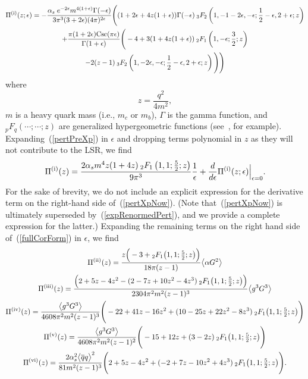 \documentclass[11pt, letterpaper]{article}
\newcommand{\hypgeom}[2]{{}_{#1}F_{#2}}
\newcommand{\rom}[1]{\uppercase\expandafter{\romannumeral #1\relax}}
\begin{document}
\begin{multline} \label{pertPreXp}
  \Pi^{(\mathrm{\rom{1}})}(z ; \epsilon) = -\frac{\alpha_s \; e^{-2 \epsilon} m^{4(1+\epsilon)} \Gamma(-\epsilon)}{3 \pi^3(3+2 \epsilon)(4 \pi)^{2 \epsilon}}  \Bigg(
  (1 + 2 \epsilon + 4 z (1 + \epsilon)) \Gamma(-\epsilon) \:\hypgeom{3}{2}\left(1,-1-2\epsilon,-\epsilon;\frac{1}{2}-\epsilon,2+\epsilon;z\right)\\
   + \frac{\pi (1+2 \epsilon) \mathrm{Csc}(\pi \epsilon)}{\Gamma(1+\epsilon)} \Bigg(
  -4 + 3 (1 + 4 z (1 + \epsilon)) \:\hypgeom{2}{1}\left(1,-\epsilon;\frac{3}{2};z\right)\\
   -2 (z - 1) \:\hypgeom{3}{2}\left(1,-2\epsilon,-\epsilon;\frac{1}{2}-\epsilon,2+\epsilon;z\right)
  \Bigg)
  \Bigg)
\end{multline}
%
where
%
\begin{equation}
  z=\frac{q^2}{4m^2},
\end{equation}
%
$m$ is a heavy quark mass (i.e., $m_c$ or $m_b$), $\Gamma$ is the gamma function, and 
$\hypgeom{p}{q}(\cdots;\cdots;z)$ are generalized hypergeometric functions 
(see~\cite{AbramowitzStegun1965}, for example). 
Expanding~(\ref{pertPreXp}) in $\epsilon$ and dropping terms polynomial in $z$ as they will not contribute to the LSR, we find
%
\begin{equation} \label{pertXpNow}
\Pi^{(\mathrm{\rom{1}})}(z) =\frac{2\alpha_s m^4 z(1+4z)\:\hypgeom{2}{1}\left(1,1;\frac{5}{2};z\right)}{9\pi^3}\frac{1}{\epsilon}
+\frac{d}{d\epsilon}\Pi^{(\mathrm{\rom{1}})}(z ; \epsilon) \Big|_{\epsilon = 0}.
\end{equation}
%
For the sake of brevity, we do not include an explicit expression for the derivative
term on the right-hand side of~(\ref{pertXpNow}).
(Note that~(\ref{pertXpNow}) is ultimately superseded by~(\ref{expRenormedPert}),
and we provide a complete expression for the latter.)
Expanding the remaining terms on the right hand side of~(\ref{fullCorForm}) in $\epsilon$, we find
%
\begin{gather}
\Pi^{(\mathrm{\rom{2}})}(z) = \frac{z\Big(-3+\hypgeom{2}{1}\big(1,1;\frac{5}{2};z\big)\Big)}{18\pi(z-1)}
\big\langle\alpha G^{2} \big\rangle
\label{expfourd}\\
%
\Pi^{(\mathrm{\rom{3}})}(z) = \frac{\Big(2+5z-4z^2-(2-7z+10z^2-4z^3)\:\hypgeom{2}{1}\big(1,1;\frac{5}{2};z\big)\Big)}{2304\pi^2 m^2 (z-1)^3}
\big\langle g^{3} G^{3} \big\rangle
\label{expsixd}\\
%
\Pi^{(\text{\rom{4}})}(z) = \frac{\big\langle g^{3} G^{3} \big\rangle}{4608\pi^2 m^2 (z-1)^3}\Bigg( -22+41z-16z^2+(10-25z+22z^2-8z^3)\:
\hypgeom{2}{1}\big(1,1;\textstyle{\frac{5}{2}};z\big)\Bigg)
\label{expDiag4}\\
%
\Pi^{(\text{\rom{5}})}(z) = \frac{\big\langle g^{3} G^{3} \big\rangle}{4608\pi^2 m^2 (z-1)^2}\Bigg(-15+12z+(3-2z)\:
\hypgeom{2}{1}\big(1,1;\textstyle{\frac{5}{2}};z\big)\Bigg)
\label{expDiag5}\\
%
\Pi^{(\text{\rom{6}})}(z) = \frac{2 \alpha_s^2 \big\langle \overline{q}q \big\rangle^2}{81 m^2 (z-1)^3}\Bigg( 2 +5z -4z^2 +(-2+7z-10z^2+4z^3)\:
\hypgeom{2}{1}\big(1,1;\textstyle{\frac{5}{2}};z\big)\Bigg).
\label{expDiag6}
%
\end{gather}
\end{document}
